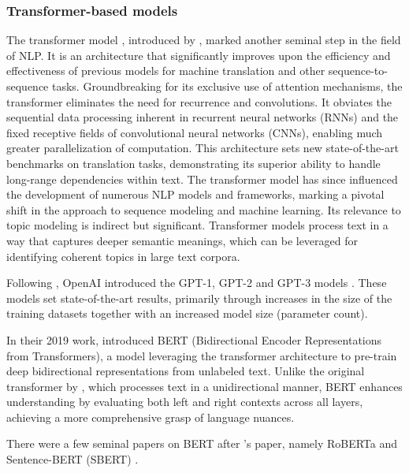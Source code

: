 \documentclass{article}
\begin{document}
\subsubsection{Transformer-based models}
The transformer model \cite{vaswani_attention_2017}, introduced by \citeauthor{vaswani_attention_2017}, marked another seminal step in the field of NLP. It is an architecture that significantly improves upon the efficiency and effectiveness of previous models for machine translation and other sequence-to-sequence tasks. Groundbreaking for its exclusive use of attention mechanisms, the transformer eliminates the need for recurrence and convolutions. It obviates the sequential data processing inherent in recurrent neural networks (RNNs) and the fixed receptive fields of convolutional neural networks (CNNs), enabling much greater parallelization of computation. This architecture sets new state-of-the-art benchmarks on translation tasks, demonstrating its superior ability to handle long-range dependencies within text. The transformer model has since influenced the development of numerous NLP models and frameworks, marking a pivotal shift in the approach to sequence modeling and machine learning. Its relevance to topic modeling is indirect but significant. Transformer models process text in a way that captures deeper semantic meanings, which can be leveraged for identifying coherent topics in large text corpora.

Following \citet{vaswani_attention_2017}, OpenAI introduced the GPT-1, GPT-2 and GPT-3 models \cite{radford_improving_nodate, radford_language_nodate, brown_language_2020}. These models set state-of-the-art results, primarily through increases in the size of the training datasets together with an increased model size (parameter count).

In their 2019 work, \citet{devlin_bert_2019} introduced BERT (Bidirectional Encoder Representations from Transformers), a model leveraging the transformer architecture to pre-train deep bidirectional representations from unlabeled text. Unlike the original transformer by \citet{vaswani_attention_2017}, which processes text in a unidirectional manner, BERT enhances understanding by evaluating both left and right contexts across all layers, achieving a more comprehensive grasp of language nuances.

There were a few seminal papers on BERT after \citeauthor{devlin_bert_2019}'s paper, namely RoBERTa \cite{liu_roberta_2019} and Sentence-BERT (SBERT) \cite{reimers_sentence-bert_2019}.
\end{document}
